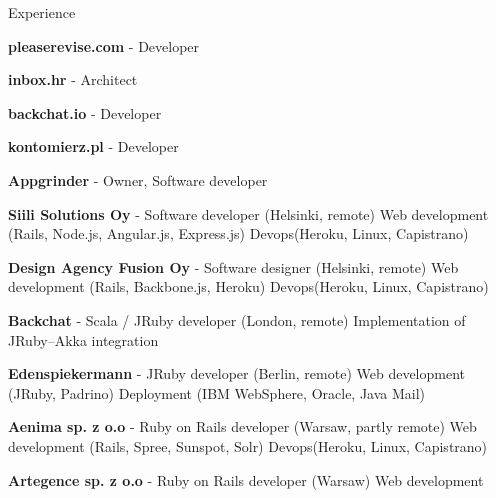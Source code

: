 
\begin{rubric}{Experience}


\entry*[01.2013--\ldots]
  \textbf{pleaserevise.com} - Developer

\entry*[10.2012--\ldots]
  \textbf{inbox.hr} - Architect

\entry*[12.2011--01.2012]
  \textbf{backchat.io} - Developer

\entry*[03.2010--10.2010]
  \textbf{kontomierz.pl} - Developer


\entry*[10.2010--\ldots]
  \textbf{Appgrinder} - Owner, Software developer

\entry*[07.2012--6.2015]
  \textbf{Siili Solutions Oy} - Software developer (Helsinki, remote)
\entry*
  Web development (Rails, Node.js, Angular.js, Express.js)
\entry*
  Devops(Heroku, Linux, Capistrano)

\entry*[07.2011--06.2012]
  \textbf{Design Agency Fusion Oy} - Software designer (Helsinki, remote)
\entry*
  Web development (Rails, Backbone.js, Heroku)
\entry*
  Devops(Heroku, Linux, Capistrano)

\entry*[12.2011--01.2012]
  \textbf{Backchat} - Scala / JRuby developer (London, remote)
\entry*
  Implementation of JRuby--Akka integration

\entry*[03.2011--05.2011]
  \textbf{Edenspiekermann} - JRuby developer (Berlin, remote)
\entry*
  Web development (JRuby, Padrino)
\entry*
  Deployment (IBM WebSphere, Oracle, Java Mail)

\entry*[10.2010--06.2011]
  \textbf{Aenima sp. z o.o} - Ruby on Rails developer (Warsaw, partly remote)
\entry*
  Web development (Rails, Spree, Sunspot, Solr)
\entry*
  Devops(Heroku, Linux, Capistrano)

\entry*[03.2010--10.2010]
  \textbf{Artegence sp. z o.o} - Ruby on Rails developer (Warsaw)
\entry*
  Web development

\end{rubric}
